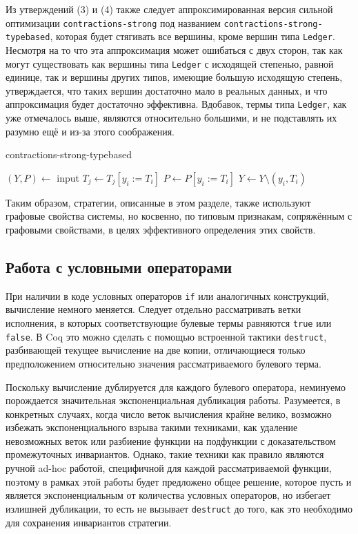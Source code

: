 \documentclass[../diploma.tex]{subfiles}
\begin{document}
Из утверждений (3) и (4) также следует аппроксимированная версия сильной оптимизации \texttt{contractions-strong} под названием \texttt{contractions-strong-typebased}, которая будет стягивать все вершины, кроме вершин типа \texttt{Ledger}. Несмотря на то что эта аппроксимация может ошибаться с двух сторон, так как могут существовать как вершины типа \texttt{Ledger} с исходящей степенью, равной единице, так и вершины других типов, имеющие большую исходящую степень, утверждается, что таких вершин достаточно мало в реальных данных, и что аппроксимация будет достаточно эффективна. Вдобавок, термы типа \texttt{Ledger}, как уже отмечалось выше, являются относительно большими, и не подставлять их разумно ещё и из-за этого соображения.

\begin{megaalgorithm}
    \caption{contractions-strong-typebased}
  \begin{algorithmic}
    \State $(Y, P)\gets$ input
        \If{\textcolor{red}{$typeof(y_i)$ is not $Ledger$}}
                \State $T_j \gets T_j [y_i := T_i]$
            \EndFor
            \State $P \gets P [y_i := T_i]$
            \State $Y\gets Y \setminus (y_i, T_i)$
        \EndIf
    \EndFor
    \State {}
  \end{algorithmic}
\end{megaalgorithm}

Таким образом, стратегии, описанные в этом разделе, также используют графовые свойства системы, но косвенно, по типовым признакам, сопряжённым с графовыми свойствами, в целях эффективного определения этих свойств. 

\subsection{Работа с условными операторами}

При наличии в коде условных операторов \texttt{if} или аналогичных конструкций, вычисление немного меняется. Следует отдельно рассматривать ветки исполнения, в которых соответствующие булевые термы равняются \texttt{true} или \texttt{false}. В Coq это можно сделать с помощью встроенной тактики \texttt{destruct}, разбивающей текущее вычисление на две копии, отличающиеся только предположением относительно значения рассматриваемого булевого терма.

Поскольку вычисление дублируется для каждого булевого оператора, неминуемо порождается значительная экспоненциальная дубликация работы. Разумеется, в конкретных случаях, когда число веток вычисления крайне велико, возможно избежать экспоненциального взрыва такими техниками, как удаление невозможных веток или разбиение функции на подфункции с доказательством промежуточных инвариантов. Однако, такие техники как правило являются ручной ad-hoc работой, специфичной для каждой рассматриваемой функции, поэтому в рамках этой работы будет предложено общее решение, которое пусть и является экспоненциальным от количества условных операторов, но избегает излишней дубликации, то есть не вызывает \texttt{destruct} до того, как это необходимо для сохранения инвариантов стратегии.
\end{document}
